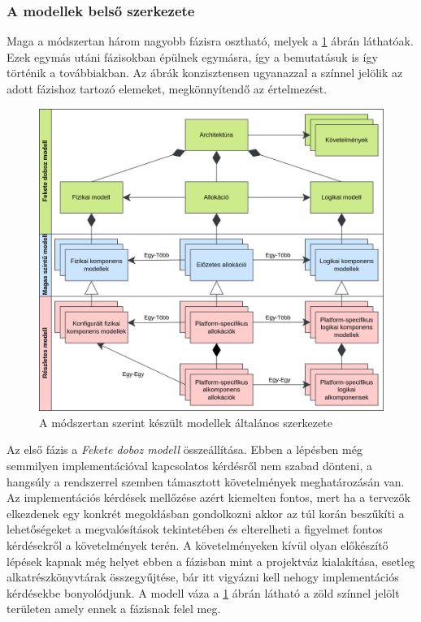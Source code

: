         \subsubsection{A modellek belső szerkezete} \label{sec:ModellekSzerkezete}
        Maga a módszertan három nagyobb fázisra osztható, melyek a \ref{fig:ModellStruktúra} ábrán láthatóak. Ezek egymás utáni fázisokban épülnek egymásra, így a bemutatásuk is így történik a továbbiakban.
        Az ábrák konzisztensen ugyanazzal a színnel jelölik az adott fázishoz tartozó elemeket, megkönnyítendő az értelmezést.
        \begin{figure}[!ht]
            \centering
            \includegraphics[width=150mm, keepaspectratio]{figures/AllocationBased2HU.drawio.png}
            \caption{A módszertan szerint készült modellek általános szerkezete} 
            \label{fig:ModellStruktúra}
        \end{figure}

        Az első fázis a \emph{Fekete doboz modell} összeállítása. Ebben a lépésben még semmilyen implementációval kapcsolatos kérdésről nem szabad dönteni, a hangsúly a rendszerrel szemben támasztott követelmények meghatározásán van.
        Az implementációs kérdések mellőzése azért kiemelten fontos, mert ha a tervezők elkezdenek egy konkrét megoldásban gondolkozni akkor az túl korán beszűkíti a lehetőségeket a megvalósítások tekintetében és elterelheti a figyelmet fontos kérdésekről a követelmények terén.
        A követelményeken kívül olyan előkészítő lépések kapnak még helyet ebben a fázisban mint a projektváz kialakítása, esetleg alkatrészkönyvtárak összegyűjtése, bár itt vigyázni kell nehogy implementációs kérdésekbe bonyolódjunk.
        A modell váza a \ref{fig:ModellStruktúra} ábrán látható a zöld színnel jelölt területen amely ennek a fázisnak felel meg.
        
